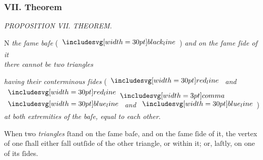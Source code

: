 \documentclass[11pt,preview]{standalone}
\begin{document}
\subsubsection{VII. Theorem}

\begin{minipage}[t]{0.55\textwidth}
    \begin{center}
        \textit{PROPOSITION VII. THEOREM.}\label{book1pr7} \\
    \end{center}

    \hfill

    \begin{center}
        \raggedright \lettrine[lines=3, loversize=1, nindent=0pt]{}{}N \textit{the ſame baſe} (\hspace{-1ex}$\blackline$\hspace{-1ex}) \textit{and on the ſame ſide of it\\ there cannot be two triangles}
    \end{center}
    \textit{having their conterminous ſides} (\hspace{-1ex}$\redline$ \textit{and} $\redline \bcomma$ $\blueline$ \textit{and} $\blueline$\hspace{-1ex}) \textit{at both extremities of} \textit{the baſe, equal to each other}.
\end{minipage}%
\hfill
\begin{minipage}[t]{0.43\textwidth}
    \vspace{20pt}
    
\end{minipage}

\hfill

\raggedright When two \textit{triangles} ſtand on the ſame baſe, and on the ſame ſide of it, the vertex of one ſhall either fall outſide of the other triangle, or within it; or, laſtly, on one of its ſides.

\hfill
\end{document}
